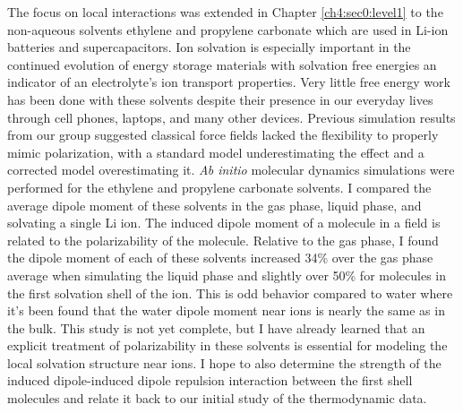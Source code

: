 \begin{conclude}
  The focus on local interactions was extended in Chapter \ref{ch4:sec0:level1} to the non-aqueous solvents ethylene and propylene carbonate which are
  used in Li-ion batteries and supercapacitors. Ion solvation is especially important in the continued evolution of energy storage materials with solvation
  free energies an indicator of an electrolyte's ion transport properties\cite{husch2015large}. Very little free energy work has been done with these solvents
  despite their presence in our everyday lives through cell phones, laptops, and many other devices. Previous simulation results from our group suggested classical
  force fields lacked the flexibility to properly mimic polarization, with a standard model underestimating the effect and a corrected model overestimating it.
  \emph{Ab initio} molecular dynamics simulations were performed for the ethylene and propylene carbonate solvents. I compared the average dipole moment
  of these solvents in the gas phase, liquid phase, and solvating a single Li\sur{+} ion. The induced dipole moment of a molecule in a field is related to 
  the polarizability of the molecule. Relative to the gas phase, I found the dipole moment of each of these solvents increased 34\% over the gas phase
  average when simulating the liquid phase and slightly over 50\% for molecules in the first solvation shell of the ion. This is odd behavior compared to
  water where it's been found that the water dipole moment near ions is nearly the same as in the bulk. This study is not yet complete, but I have already
  learned that an explicit treatment of polarizability in these solvents is essential for modeling the local solvation structure near ions. I hope to also
  determine the strength of the induced dipole-induced dipole repulsion interaction between the first shell molecules and relate it back to our initial
  study of the thermodynamic data.
  

\end{conclude}
